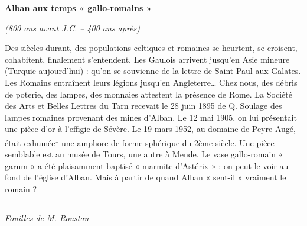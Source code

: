 
\thispagestyle{plain}

\vspace*{12mm}

\begin{center}
    {\Large\bfseries Alban aux temps « gallo-romains »}

    \vspace{2mm}
    {\itshape (800 ans avant J.C. -- 400 ans après)}
\end{center}

\vspace{18mm}

\noindent
Des siècles durant, des populations celtiques et romaines se heurtent,
se croisent, cohabitent, finalement s'entendent. Les Gaulois arrivent
jusqu'en Asie mineure (Turquie aujourd'hui) : qu'on se souvienne de la
lettre de Saint Paul aux Galates. Les Romains entraînent leurs légions
jusqu'en Angleterre\ldots{} Chez nous, des débris de poterie, des lampes,
des monnaies attestent la présence de Rome. La Société des Arts et Belles
Lettres du Tarn recevait le 28 juin 1895 de Q. Soulage des lampes romaines
provenant des mines d'Alban. Le 12 mai 1905, on lui présentait une pièce
d'or à l'effigie de Sévère. Le 19 mars 1952, au domaine de Peyre-Augé,
était exhumée\textsuperscript{1} une amphore de forme sphérique du
2ème siècle. Une pièce semblable est au musée de Tours, une autre à
Mende. Le vase gallo-romain « garum » a été plaisamment baptisé
« marmite d'Astérix » : on peut le voir au fond de l'église d'Alban.
Mais à partir de quand Alban « sent-il » vraiment le romain ?

\vfill

\noindent\rule{55mm}{0.4pt}

\vspace{1mm}
{\small\itshape Fouilles de M. Roustan}
